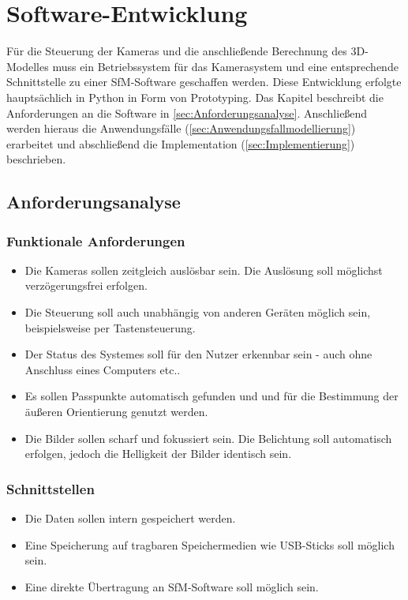 \documentclass[./00PhotoBox.tex]{subfiles}
\begin{document}
\chapter{Software-Entwicklung}
Für die Steuerung der Kameras und die anschließende Berechnung des 3D-Modelles muss ein Betriebssystem für das Kamerasystem und eine entsprechende Schnittstelle zu einer \gls{SfM}-Software geschaffen werden. Diese Entwicklung erfolgte hauptsächlich in Python in Form von Prototyping. Das Kapitel beschreibt die Anforderungen an die Software in \autoref{sec:Anforderungsanalyse}. Anschließend werden hieraus die Anwendungsfälle (\autoref{sec:Anwendungsfallmodellierung}) erarbeitet und abschließend die Implementation (\autoref{sec:Implementierung}) beschrieben.

\section{Anforderungsanalyse}
\label{sec:Anforderungsanalyse}

\subsection{Funktionale Anforderungen}
\begin{itemize}
    \item Die Kameras sollen zeitgleich auslösbar sein. Die Auslösung soll möglichst ver\-zögerungs\-frei erfolgen.
    \item Die Steuerung soll auch unabhängig von anderen Geräten möglich sein, beispielsweise per Tastensteuerung.
    \item Der Status des Systemes soll für den Nutzer erkennbar sein - auch ohne Anschluss eines Computers etc..
    \item Es sollen Passpunkte automatisch gefunden und und für die Bestimmung der äußeren Orientierung genutzt werden.
    \item Die Bilder sollen scharf und fokussiert sein. Die Belichtung soll automatisch erfolgen, jedoch die Helligkeit der Bilder identisch sein.
\end{itemize}

\subsection{Schnittstellen}
\begin{itemize}
    \item Die Daten sollen intern gespeichert werden.
    \item Eine Speicherung auf tragbaren Speichermedien wie USB-Sticks soll möglich sein.
    \item Eine direkte Übertragung an \gls{SfM}-Software soll möglich sein.
\end{itemize}
\end{document}
